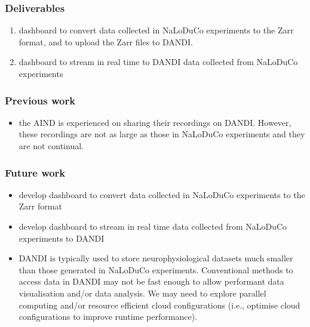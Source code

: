 
\begin{frame}
    \frametitle{Deliverables}

    \begin{enumerate}

        \item dashboard to convert data collected in NaLoDuCo experiments to the Zarr format, and to upload the Zarr files to DANDI.

        \item dashboard to stream in real time to DANDI data collected from NaLoDuCo experiments

\end{enumerate}

\end{frame}

\begin{frame}
    \frametitle{Previous work}

    \begin{itemize}

        \item the AIND is experienced on sharing their recordings on DANDI.
        However, these recordings are not as large as those in NaLoDuCo
        experiments and they are not continual.

\end{itemize}

\end{frame}

\begin{frame}
    \frametitle{Future work}

    \begin{itemize}

        \item develop dashboard to convert data collected in NaLoDuCo
            experiments to the Zarr format

        \item develop dashboard to stream in real time data collected from
            NaLoDuCo experiments to DANDI

        \item DANDI is typically used to store neurophysiological datasets much
        smaller than those generated in NaLoDuCo experiments. Conventional
        methods to access data in DANDI may not be fast enough to allow
        performant data visualisation and/or data analysis. We may need to
        explore parallel computing and/or resource efficient cloud
        configurations (i.e., optimise cloud configurations to improve runtime
        performance).

    \end{itemize}

\end{frame}
